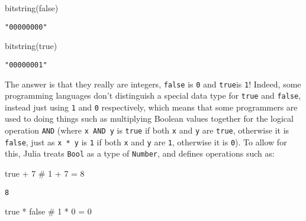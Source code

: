\documentclass[
  letterpaper,
  DIV=11,
  numbers=noendperiod]{scrreprt}
\newenvironment{Shaded}{\begin{snugshade}}{\end{snugshade}}
\newcommand{\CommentTok}[1]{\textcolor[rgb]{0.37,0.37,0.37}{#1}}
\newcommand{\ConstantTok}[1]{\textcolor[rgb]{0.56,0.35,0.01}{#1}}
\newcommand{\FloatTok}[1]{\textcolor[rgb]{0.68,0.00,0.00}{#1}}
\newcommand{\FunctionTok}[1]{\textcolor[rgb]{0.28,0.35,0.67}{#1}}
\newcommand{\NormalTok}[1]{\textcolor[rgb]{0.00,0.23,0.31}{#1}}
\newcommand{\OperatorTok}[1]{\textcolor[rgb]{0.37,0.37,0.37}{#1}}
\begin{document}
\begin{Shaded}
\begin{Highlighting}[]
\FunctionTok{bitstring}\NormalTok{(}\ConstantTok{false}\NormalTok{)}
\end{Highlighting}
\end{Shaded}

\begin{verbatim}
"00000000"
\end{verbatim}

\begin{Shaded}
\begin{Highlighting}[]
\FunctionTok{bitstring}\NormalTok{(}\ConstantTok{true}\NormalTok{)}
\end{Highlighting}
\end{Shaded}

\begin{verbatim}
"00000001"
\end{verbatim}

The answer is that they really are integers, \texttt{false} is
\texttt{0} and \texttt{true}is \texttt{1}! Indeed, some programming
languages don't distinguish a special data type for \texttt{true} and
\texttt{false}, instead just using \texttt{1} and \texttt{0}
respectively, which means that some programmers are used to doing things
such as multiplying Boolean values together for the logical operation
\texttt{AND} (where \texttt{x\ AND\ y} is \texttt{true} if both
\texttt{x} and \texttt{y} are \texttt{true}, otherwise it is
\texttt{false}, just as \texttt{x\ *\ y} is \texttt{1} if both
\texttt{x} and \texttt{y} are \texttt{1}, otherwise it is \texttt{0}).
To allow for this, Julia treats \texttt{Bool} as a type of
\texttt{Number}, and defines operations such as:

\begin{Shaded}
\begin{Highlighting}[]
\ConstantTok{true} \OperatorTok{+} \FloatTok{7} \CommentTok{\# 1 + 7 = 8}
\end{Highlighting}
\end{Shaded}

\begin{verbatim}
8
\end{verbatim}

\begin{Shaded}
\begin{Highlighting}[]
\ConstantTok{true} \OperatorTok{*} \ConstantTok{false} \CommentTok{\# 1 * 0 = 0}
\end{Highlighting}
\end{Shaded}
\end{document}
